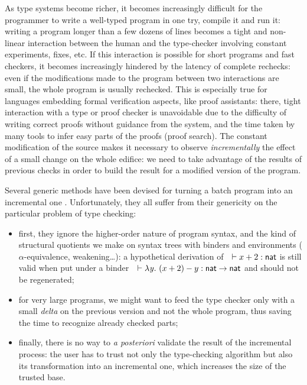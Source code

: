 \documentclass[9pt]{sigplanconf}
\begin{document}
As type systems become richer, it becomes increasingly difficult for
the programmer to write a well-typed program in one try, compile it
and run it: writing a program longer than a few dozens of lines
becomes a tight and non-linear interaction between the human and the
type-checker involving constant experiments, fixes, etc. If this
interaction is possible for short programs and fast checkers, it
becomes increasingly hindered by the latency of complete rechecks:
even if the modifications made to the program between two interactions
are small, the whole program is usually rechecked. This is especially
true for languages embedding formal verification aspects, like proof
assistants: there, tight interaction with a type or proof checker is
unavoidable due to the difficulty of writing correct proofs without
guidance from the system, and the time taken by many tools to infer
easy parts of the proofs (proof search). The constant modification of
the source makes it necessary to observe \emph{incrementally} the
effect of a small change on the whole edifice: we need to take
advantage of the results of previous checks in order to build the
result for a modified version of the program.

Several generic methods have been devised for turning a batch program
into an incremental one \cite{pugh1989incremental,
  acar2003selective}. Unfortunately, they all suffer from their
genericity on the particular problem of type checking:
\begin{itemize}
\item first, they ignore the higher-order nature of program syntax,
  and the kind of structural quotients we make on syntax trees with
  binders and environments ($\alpha$-equivalence, weakening\ldots): a
  hypothetical derivation of\ \ $\vdash x+2 : \text{\textsf{nat}}$ is still valid
  when put under a binder\ \ $\vdash\lambda{\ensuremath{\text{\textit{y}}}}.\  (x + 2) -
  y:\text{\textsf{nat}}\to\text{\textsf{nat}}$ and should not be regenerated;
\item for very large programs, we might want to feed the type checker
  only with a small \emph{delta} on the previous version and not the
  whole program, thus saving the time to recognize already checked
  parts;
\item finally, there is no way to \emph{a posteriori} validate the
  result of the incremental process: the user has to trust not only
  the type-checking algorithm but also its transformation into an
  incremental one, which increases the size of the trusted base.
\end{itemize}
\end{document}
